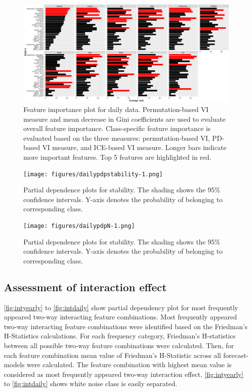 \documentclass[11pt,a4paper,]{article}
\begin{document}
\begin{figure}[h]

{\centering \includegraphics{figures/vidaily-1} 

}

\caption{Feature importance plot for daily data. Permutation-based VI measure and mean decrease in Gini coefficients are used to evaluate overall feature importance. Class-specific feature importance is evaluated based on the three measures: permutation-based VI, PD-based VI measure, and ICE-based VI measure. Longer bars indicate more important features. Top 5 features are highlighted in red.}\label{fig:vidaily}
\end{figure}

\begin{figure}
\centering
\texttt{[image: figures/dailypdpstability-1.png]}
\caption{\label{fig:dailypdpstability}Partial dependence plots for
stability. The shading shows the 95\% confidence intervals. Y-axis
denotes the probability of belonging to corresponding class.}
\end{figure}

\begin{figure}
\centering
\texttt{[image: figures/dailypdpN-1.png]}
\caption{\label{fig:dailypdpN}Partial dependence plots for stability. The
shading shows the 95\% confidence intervals. Y-axis denotes the
probability of belonging to corresponding class.}
\end{figure}

\subsection{Assessment of interaction
effect}\label{assessment-of-interaction-effect-1}

\autoref{fig:intyearly} to \autoref{fig:intdaily} show partial
dependency plot for most frequently appeared two-way interacting feature
combinations. Most frequently appeared two-way interacting feature
combinations were identified based on the Friedman's H-Statistics
calculations. For each frequency category, Friedman's H-statistics
between all possible two-way feature combinations were calculated. Then,
for each feature combination mean value of Friedman's H-Statistic across
all forecast-models were calculated. The feature combination with
highest mean value is considered as most frequently appeared two-way
interaction effect. \autoref{fig:intyearly} to \autoref{fig:intdaily}
shows white noise class is easily separated.
\end{document}
